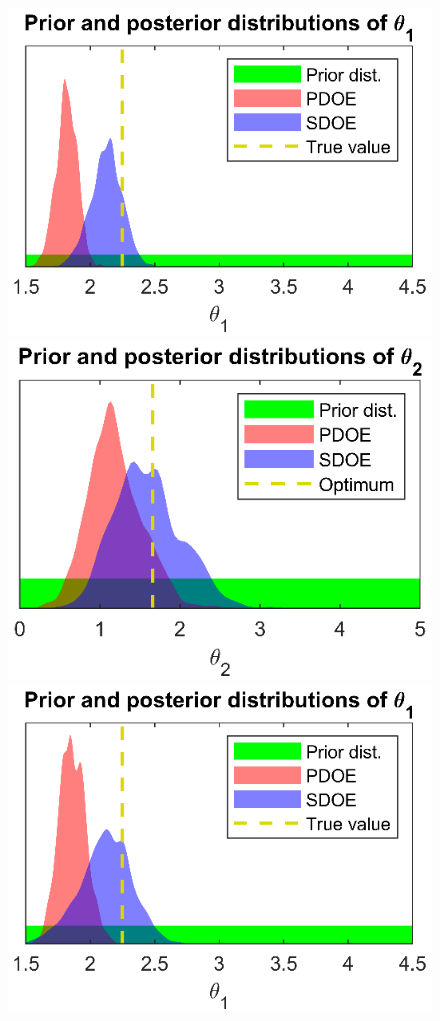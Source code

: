 \documentclass[12pt]{article}
\begin{document}
%
\begin{figure}
	\centering
	\includegraphics[scale=0.85]{FIG_dual_calib_SDOE_comp_theta1-d0}
	\includegraphics[scale=0.85]{FIG_dual_calib_SDOE_comp_theta2-d0}\\
	\includegraphics[scale=0.85]{FIG_dual_calib_SDOE_comp_theta1-d1}

\end{figure}
\end{document}
